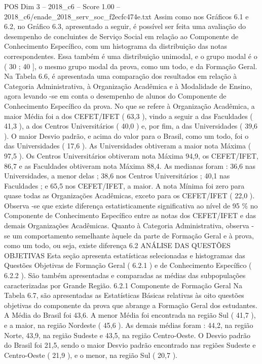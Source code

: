 \begin{textsample}{POS Dim 3 – 2018\_c6 – Score 1.00 – 2018\_c6/enade\_2018\_serv\_soc\_f2ecfc474e.txt}
Assim como nos Gráficos 6.1 e 6.2, no Gráfico 6.3, apresentado a seguir, é possível ser feita uma avaliação do desempenho de concluintes de Serviço Social em relação ao Componente de Conhecimento Específico, com um histograma da distribuição das notas correspondentes.
Essa também é uma distribuição unimodal, e o grupo modal é o ( 30 ; 40 ], o mesmo grupo modal da prova, como um todo, e da Formação Geral.
Na Tabela 6.6, é apresentada uma comparação dos resultados em relação à Categoria Administrativa, à Organização Acadêmica e à Modalidade de Ensino, agora levando -se em conta o desempenho de alunos do Componente de Conhecimento Específico da prova.
No que se refere à Organização Acadêmica, a maior Média foi a dos CEFET/IFET ( 63,3 ), vindo a seguir a das Faculdades ( 41,3 ), a dos Centros Universitários ( 40,0 ) e, por fim, a das Universidades ( 39,6 ).
O maior Desvio padrão, e acima do valor para o Brasil, como um todo, foi o das Universidades ( 17,6 ).
As Universidades obtiveram a maior nota Máxima ( 97,5 ).
Os Centros Universitários obtiveram nota Máxima 94,9, os CEFET/IFET, 86,7 e as Faculdades obtiveram nota Máxima 88,4.
As medianas foram : 36,6 nas Universidades, a menor delas ; 38,6 nos Centros Universitários ; 40,1 nas Faculdades ; e 65,5 nos CEFET/IFET, a maior.
A nota Mínima foi zero para quase todas as Organizações Acadêmicas, exceto para os CEFET/IFET ( 22,0 ).
Observa -se que existe diferença estatisticamente significativa ao nível de 95 \% no Componente de Conhecimento Específico entre as notas dos CEFET/IFET e das demais Organizações Acadêmicas.
Quanto à Categoria Administrativa, observa -se um comportamento semelhante àquele da parte de Formação Geral e à prova, como um todo, ou seja, existe diferença 6.2 ANÁLISE DAS QUESTÕES OBJETIVAS Esta seção apresenta estatísticas selecionadas e histogramas das Questões Objetivas de Formação Geral ( 6.2.1 ) e de Conhecimento Específico ( 6.2.2 ).
São também apresentadas e comparadas as médias das subpopulações caracterizadas por Grande Região. 6.2.1 Componente de Formação Geral Na Tabela 6.7, são apresentadas as Estatísticas Básicas relativas às oito questões objetivas do componente da prova que abrange a Formação Geral dos estudantes.
A Média do Brasil foi 43,6.
A menor Média foi encontrada na região Sul ( 41,7 ), e a maior, na região Nordeste ( 45,6 ).
As demais médias foram : 44,2, na região Norte, 43,9, na região Sudeste e 43,5, na região Centro-Oeste.
O Desvio padrão do Brasil foi 21,5, sendo o maior Desvio padrão encontrado nas regiões Sudeste e Centro-Oeste ( 21,9 ), e o menor, na região Sul ( 20,7 ).

\end{textsample}
